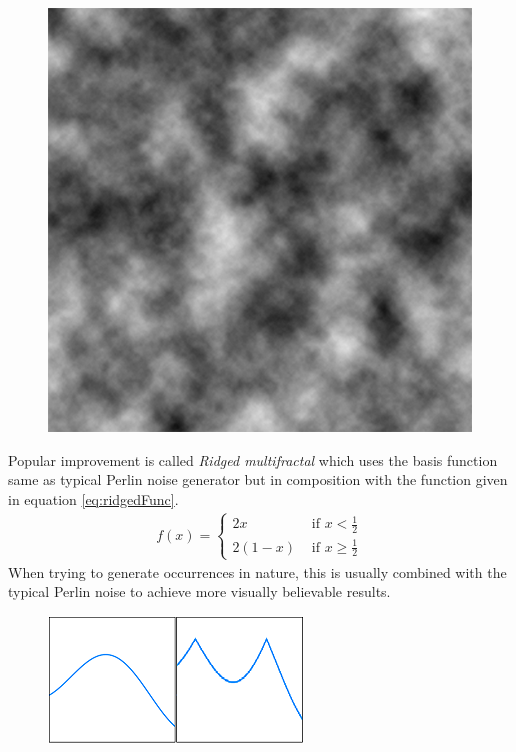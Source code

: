 \documentclass[journal]{IEEEtran}
\begin{document}
\begin{figure}[H]
	\centering
	\includegraphics[width=.6\linewidth]{perlinNoise.png}
	\label{fig:perlinNoise}
\end{figure}
Popular improvement is called \textit{Ridged multifractal} which uses the basis function same as typical Perlin noise generator but in composition with the function given in equation \ref{eq:ridgedFunc}.
\begin{gather}
\label{eq:ridgedFunc}
f(x)=\begin{cases}
2x & \text{ if } x < \frac{1}{2} \\ 
2(1-x) & \text{ if } x \geq \frac{1}{2}
\end{cases}
\end{gather}
When trying to generate occurrences in nature, this is usually combined with the typical Perlin noise to achieve more visually believable results.
\begin{figure}[H]
	\centering
	\includegraphics[width=.7\linewidth]{ridgedFormula.png}
	\label{fig:ridgedFormula}
\end{figure}
\end{document}
